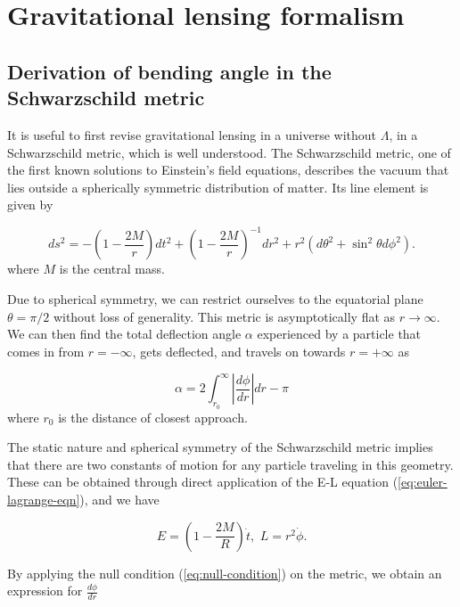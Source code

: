\chapter{Gravitational lensing formalism}
\label{chapter:gravitational-lensing-formalism}

\section{Derivation of bending angle in the Schwarzschild metric}

It is useful to first revise gravitational lensing in a universe without $\Lambda$, in a Schwarzschild metric, which is well understood. The Schwarzschild metric, one of the first known solutions to Einstein's field equations, describes the vacuum that lies outside a spherically symmetric distribution of matter. Its line element is given by

\begin{equation}
  ds^2 = -\left ( 1- \frac{2M}{r} \right ) dt^2 + \left ( 1 - \frac{2M}{r}\right )^{-1} dr^2 + r^2(d\theta^2 + \sin^2\theta d \phi^2).
  \label{eq:schwarzschild-metric}
\end{equation}
where $M$ is the central mass. 

Due to spherical symmetry, we can restrict ourselves to the equatorial plane $\theta = \pi/2$ without loss of generality. This metric is asymptotically flat as $r \rightarrow \infty$. We can then find the total deflection angle $\alpha$ experienced by a particle that comes in from $r=-\infty$, gets deflected, and travels on towards $r=+\infty$ as 

\begin{equation}
  \alpha = 2 \int_{r_0}^{\infty} \left |  \frac{d\phi}{dr} \right | dr - \pi
\end{equation}
where $r_0$ is the distance of closest approach. 

The static nature and spherical symmetry of the Schwarzschild metric implies that there are two constants of motion for any particle traveling in this geometry. These can be obtained through direct application of the E-L equation (\autoref{eq:euler-lagrange-eqn}), and we have

\begin{equation}
  E = \left ( 1 - \frac{2M}{R} \right ) \dot{t}, \,\, L = r^2\dot{\phi}.
  \label{eq:schwarzschild-constants}
\end{equation}

By applying the null condition (\autoref{eq:null-condition}) on the metric, we obtain an expression for $\frac{d\phi}{dr}$

